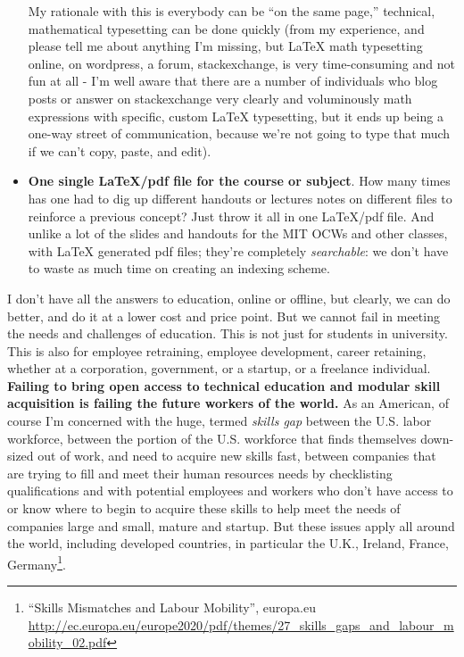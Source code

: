 \documentclass[twoside]{amsart}
\theoremstyle{plain}
\theoremstyle{definition}
\theoremstyle{remark}
\numberwithin{equation}{section}
\begin{document}
\begin{itemize}
My rationale with this is everybody can be ``on the same page,'' technical, mathematical typesetting can be done quickly (from my experience, and please tell me about anything I'm missing, but LaTeX math typesetting online, on wordpress, a forum, stackexchange, is very time-consuming and not fun at all - I'm well aware that there are a number of  individuals who blog posts or answer on stackexchange very clearly and voluminously math expressions with specific, custom LaTeX typesetting, but it ends up being a one-way street of communication, because we're not going to type that much if we can't copy, paste, and edit).  
\item \textbf{One single LaTeX/pdf file for the course or subject}.  How many times has one had to dig up different handouts or lectures notes on different files to reinforce a previous concept?  Just throw it all in one LaTeX/pdf file.  And unlike a lot of the slides and handouts for the MIT OCWs and other classes, with LaTeX generated pdf files; they're completely \emph{searchable}: we don't have to waste as much time on creating an indexing scheme.  
\end{itemize}

I don't have all the answers to education, online or offline, but clearly, we can do better, and do it at a lower cost and price point.  But we cannot fail in meeting the needs and challenges of education.  This is not just for students in university. This is also for employee retraining, employee development, career retaining, whether at a corporation, government, or a startup, or a freelance individual. \textbf{Failing to bring open access to technical education and modular skill acquisition is failing the future workers of the world.}  As an American, of course I'm concerned with the huge, termed \emph{skills gap} between the U.S. labor workforce, between the portion of the U.S. workforce that finds themselves down-sized out of work, and need to acquire new skills fast, between companies that are trying to fill and meet their human resources needs by checklisting qualifications and with potential employees and workers who don't have access to or know where to begin to acquire these skills to help meet the needs of companies large and small, mature and startup.  But these issues apply all around the world, including developed countries, in particular the U.K., Ireland, France, Germany\footnote{``Skills Mismatches and Labour Mobility'', europa.eu \url{http://ec.europa.eu/europe2020/pdf/themes/27_skills_gaps_and_labour_mobility_02.pdf}}.   
\end{document}
